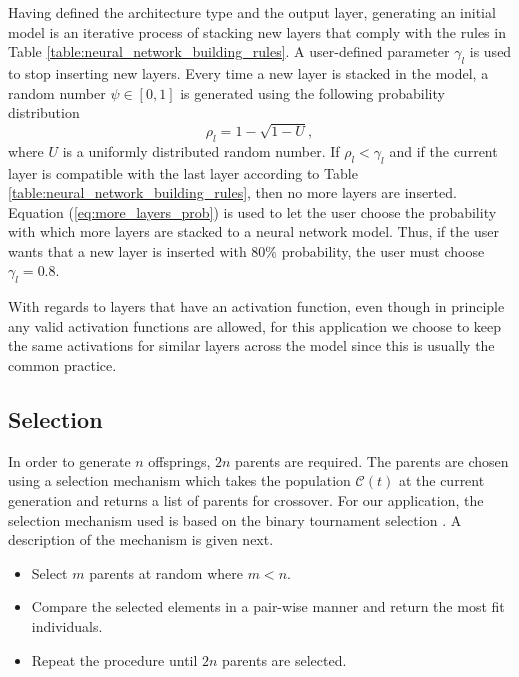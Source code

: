 \documentclass[preprint,12pt]{elsarticle}%
\begin{document}
Having defined the architecture type and the output layer, generating an initial model is an iterative process of stacking new layers that comply with the rules in Table \ref{table:neural_network_building_rules}. A user-defined parameter $\gamma_l$ is used to stop inserting new layers. Every time a new layer is stacked in the model, a random number $\psi \in \left[0,1\right]$ is generated using the following probability distribution
\begin{equation}
\rho_l = 1 - \sqrt{1 - U},
\label{eq:more_layers_prob}
\end{equation}
where $U$ is a uniformly distributed random number. If $\rho_l < \gamma_l$ and if the current layer is compatible with the last layer according to Table \ref{table:neural_network_building_rules}, then no more layers are inserted. Equation (\ref{eq:more_layers_prob}) is used to let the user choose the probability with which more layers are stacked to a neural network model. Thus, if the user wants that a new layer is inserted with $80\%$ probability, the user must choose $\gamma_l = 0.8$. 

With regards to layers that have an activation function, even though in principle any valid activation functions are allowed, for this application we choose to keep the same activations for similar layers across the model since this is usually the common practice. 

\subsection{Selection}
\label{sec:selection}

In order to generate $n$ offsprings, $2n$ parents are required. The parents are chosen using a selection mechanism which takes the population $\mathcal{C}(t)$ at the current generation and returns a list of parents for crossover. For our application, the selection mechanism used is based on the binary tournament selection \cite{Engelbrecht2007,Krishnakumar1989}. A description of the mechanism is given next.

\begin{itemize}
\item Select $m$ parents at random where $m < n$.
\item Compare the selected elements in a pair-wise manner and return the most fit individuals.
\item Repeat the procedure until $2n$ parents are selected.
\end{itemize}
\end{document}
